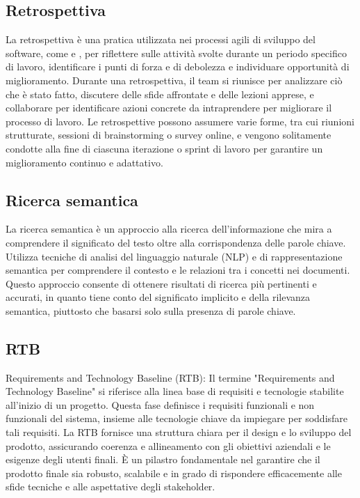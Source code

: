\subsection*{Retrospettiva}
La retrospettiva è una pratica utilizzata nei processi agili di sviluppo del software, come  e , per riflettere sulle attività svolte durante un periodo specifico di lavoro, identificare i punti di forza e di debolezza e individuare opportunità di miglioramento. Durante una retrospettiva, il team si riunisce per analizzare ciò che è stato fatto, discutere delle sfide affrontate e delle lezioni apprese, e collaborare per identificare azioni concrete da intraprendere per migliorare il processo di lavoro. Le retrospettive possono assumere varie forme, tra cui riunioni strutturate, sessioni di brainstorming o survey online, e vengono solitamente condotte alla fine di ciascuna iterazione o sprint di lavoro per garantire un miglioramento continuo e adattativo.

\vspace{2em}
\subsection*{Ricerca semantica}
La ricerca semantica è un approccio alla ricerca dell'informazione che mira a comprendere il significato del testo oltre alla corrispondenza delle parole chiave. Utilizza tecniche di analisi del linguaggio naturale (NLP) e di rappresentazione semantica per comprendere il contesto e le relazioni tra i concetti nei documenti. Questo approccio consente di ottenere risultati di ricerca più pertinenti e accurati, in quanto tiene conto del significato implicito e della rilevanza semantica, piuttosto che basarsi solo sulla presenza di parole chiave.

\vspace{2em}
\subsection*{RTB}
Requirements and Technology Baseline (RTB): Il termine "Requirements and Technology Baseline" si riferisce alla linea base di requisiti e tecnologie stabilite all'inizio di un progetto. Questa fase definisce i requisiti funzionali e non funzionali del sistema, insieme alle tecnologie chiave da impiegare per soddisfare tali requisiti. La RTB fornisce una struttura chiara per il design e lo sviluppo del prodotto, assicurando coerenza e allineamento con gli obiettivi aziendali e le esigenze degli utenti finali. È un pilastro fondamentale nel garantire che il prodotto finale sia robusto, scalabile e in grado di rispondere efficacemente alle sfide tecniche e alle aspettative degli stakeholder.
